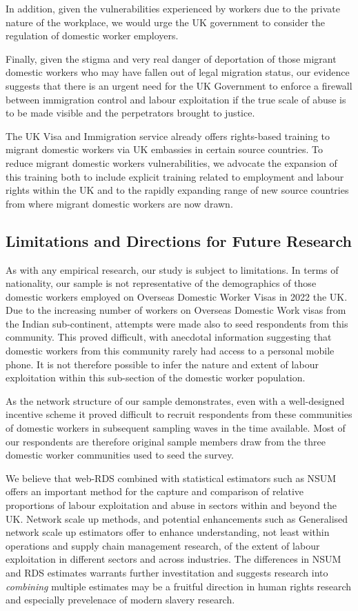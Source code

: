 \documentclass[
  12pt,
  letterpaper,
  DIV=11,
  numbers=noendperiod]{scrartcl}
\theoremstyle{plain}
\theoremstyle{definition}
\begin{document}
In addition, given the vulnerabilities experienced by workers due to the
private nature of the workplace, we would urge the UK government to
consider the regulation of domestic worker employers.

Finally, given the stigma and very real danger of deportation of those
migrant domestic workers who may have fallen out of legal migration
status, our evidence suggests that there is an urgent need for the UK
Government to enforce a firewall between immigration control and labour
exploitation if the true scale of abuse is to be made visible and the
perpetrators brought to justice.

The UK Visa and Immigration service already offers rights-based training
to migrant domestic workers via UK embassies in certain source
countries. To reduce migrant domestic workers vulnerabilities, we
advocate the expansion of this training both to include explicit
training related to employment and labour rights within the UK and to
the rapidly expanding range of new source countries from where migrant
domestic workers are now drawn.

\subsection{Limitations and Directions for Future
Research}\label{limitations-and-directions-for-future-research}

As with any empirical research, our study is subject to limitations. In
terms of nationality, our sample is not representative of the
demographics of those domestic workers employed on Overseas Domestic
Worker Visas in 2022 the UK. Due to the increasing number of workers on
Overseas Domestic Work visas from the Indian sub-continent, attempts
were made also to seed respondents from this community. This proved
difficult, with anecdotal information suggesting that domestic workers
from this community rarely had access to a personal mobile phone. It is
not therefore possible to infer the nature and extent of labour
exploitation within this sub-section of the domestic worker population.

As the network structure of our sample demonstrates, even with a
well-designed incentive scheme it proved difficult to recruit
respondents from these communities of domestic workers in subsequent
sampling waves in the time available. Most of our respondents are
therefore original sample members draw from the three domestic worker
communities used to seed the survey.

We believe that web-RDS combined with statistical estimators such as
NSUM offers an important method for the capture and comparison of
relative proportions of labour exploitation and abuse in sectors within
and beyond the UK. Network scale up methods, and potential enhancements
such as Generalised network scale up estimators offer to enhance
understanding, not least within operations and supply chain management
research, of the extent of labour exploitation in different sectors and
across industries. The differences in NSUM and RDS estimates warrants
further investitation and suggests research into \emph{combining}
multiple estimates may be a fruitful direction in human rights research
and especially prevelenace of modern slavery research.
\end{document}
